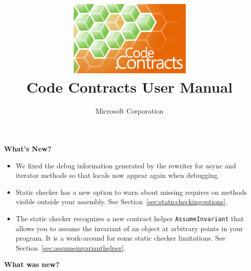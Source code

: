 \documentclass{article}
\title{
  \includegraphics[width=.43\columnwidth]{codecontracts_SM.png}
\\
Code Contracts User Manual
}
\author{Microsoft Corporation}
\newcommand{\code}[1]{\lstinline{#1}}
\begin{document}
\maketitle

\noindent 
\textbf{What's New?}
\begin{itemize}
\item We fixed the debug information generated by the rewriter for async and iterator methods so that locals now appear again when debugging.
\item Static checker has a new option to warn about missing requires on methods visible outside your assembly. See Section~\ref{sec:staticcheckingoptions}.
\item The static checker recognizes a new contract helper \code{AssumeInvariant} that allows you to assume the invariant of an object at arbitrary points in your program. It is a work-around for some static checker limitations. See Section~\ref{sec:assumeinvarianthelper}.
\end{itemize}
\textbf{What was new?}
\end{document}
